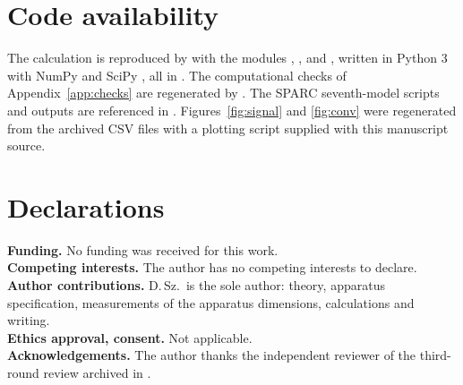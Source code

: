 \documentclass[12pt,a4paper]{article}
\begin{document}
\section*{Code availability}
The calculation is reproduced by  with the modules ,
, and , written in Python 3 with NumPy \cite{NumPy2020} and
SciPy \cite{SciPy2020}, all in . The computational checks of Appendix~\ref{app:checks} are regenerated by
. The SPARC seventh-model scripts and outputs are referenced in
 \cite{TAL_repo,TAL_V19}. Figures~\ref{fig:signal} and \ref{fig:conv} were regenerated from
the archived CSV files with a plotting script supplied with this manuscript source.

\section*{Declarations}
\noindent\textbf{Funding.} No funding was received for this work.\\
\textbf{Competing interests.} The author has no competing interests to declare.\\
\textbf{Author contributions.} D.\,Sz.\ is the sole author: theory, apparatus specification, measurements of the
apparatus dimensions, calculations and writing.\\
\textbf{Ethics approval, consent.} Not applicable.\\
\textbf{Acknowledgements.} The author thanks the independent reviewer of the third-round review archived in
\cite{TAL_V20}.

\appendix
\end{document}
